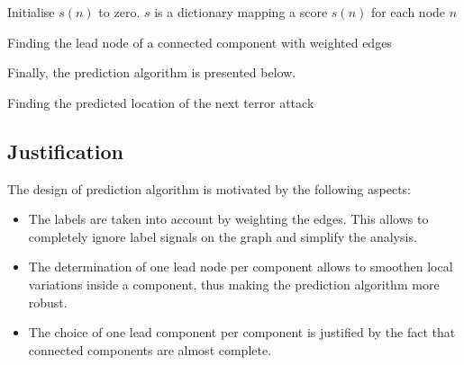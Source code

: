 \begin{algorithm}[H]
\vspace{-.5em}

 
 
 Initialise $s(n)$ to zero. $s$ is a dictionary mapping a score $s(n)$ for each node $n$
 
 \label{alg:leadNode}
 \caption{Finding the lead node of a connected component with weighted edges}
\end{algorithm}

\vspace{1em}

Finally, the prediction algorithm is presented below. 

\vspace{1em}

\begin{algorithm}[H]
\vspace{-.5em}

 
 \caption{Finding the predicted location of the next terror attack}
\end{algorithm}

\subsection{Justification}
\label{subsec:Justification}
The design of prediction algorithm is motivated by the following aspects:
\begin{itemize}
\item The labels are taken into account by weighting the edges. This allows to completely ignore label signals on the graph and simplify the analysis.
\item The determination of one lead node per component allows to smoothen local variations inside a component, thus making the prediction algorithm more robust.
\item The choice of one lead component per component is justified by the fact that connected components are almost complete.
\end{itemize}

